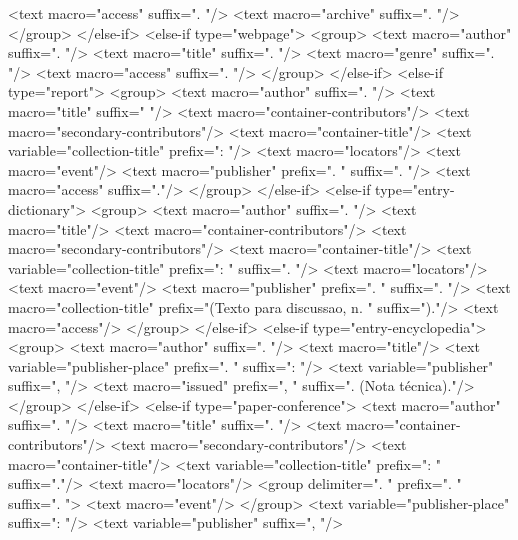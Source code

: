             <text macro="access" suffix=". "/>
            <text macro="archive" suffix=". "/>
          </group>
        </else-if>
        <else-if type="webpage">
          <group>
            <text macro="author" suffix=". "/>
            <text macro="title" suffix=". "/>
            <text macro="genre" suffix=". "/>
            <text macro="access" suffix=". "/>
          </group>
        </else-if>
        <else-if type="report">
          <group>
            <text macro="author" suffix=". "/>
            <text macro="title" suffix=" "/>
            <text macro="container-contributors"/>
            <text macro="secondary-contributors"/>
            <text macro="container-title"/>
            <text variable="collection-title" prefix=": "/>
            <text macro="locators"/>
            <text macro="event"/>
            <text macro="publisher" prefix=". " suffix=". "/>
            <text macro="access" suffix="."/>
          </group>
        </else-if>
        <else-if type="entry-dictionary">
          <group>
            <text macro="author" suffix=". "/>
            <text macro="title"/>
            <text macro="container-contributors"/>
            <text macro="secondary-contributors"/>
            <text macro="container-title"/>
            <text variable="collection-title" prefix=": " suffix=". "/>
            <text macro="locators"/>
            <text macro="event"/>
            <text macro="publisher" prefix=". " suffix=". "/>
            <text macro="collection-title" prefix="(Texto para discussao, n. " suffix=")."/>
            <text macro="access"/>
          </group>
        </else-if>
        <else-if type="entry-encyclopedia">
          <group>
            <text macro="author" suffix=". "/>
            <text macro="title"/>
            <text variable="publisher-place" prefix=". " suffix=": "/>
            <text variable="publisher" suffix=", "/>
            <text macro="issued" prefix=", " suffix=". (Nota técnica)."/>
          </group>
        </else-if>
        <else-if type="paper-conference">
          <text macro="author" suffix=". "/>
          <text macro="title" suffix=". "/>
          <text macro="container-contributors"/>
          <text macro="secondary-contributors"/>
          <text macro="container-title"/>
          <text variable="collection-title" prefix=": " suffix="."/>
          <text macro="locators"/>
          <group delimiter=". " prefix=". " suffix=". ">
            <text macro="event"/>
          </group>
          <text variable="publisher-place" suffix=": "/>
          <text variable="publisher" suffix=", "/>
